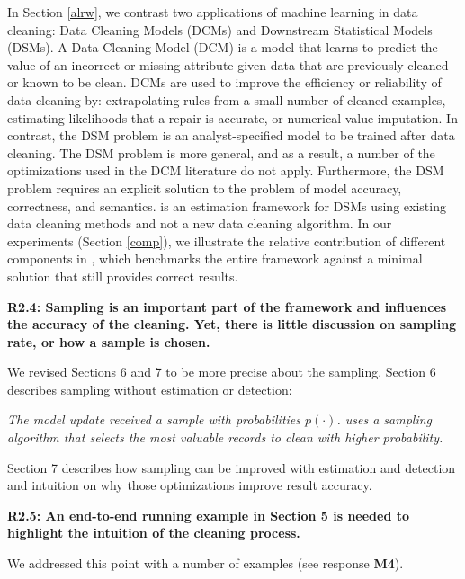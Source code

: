 In Section \ref{alrw}, we contrast two applications of machine learning in data cleaning: Data Cleaning Models (DCMs) and Downstream Statistical Models (DSMs).
A Data Cleaning Model (DCM) is a model that learns to predict the value of an incorrect or missing attribute given data that are previously cleaned or known to be clean.
DCMs are used to improve the efficiency or reliability of data cleaning by: extrapolating rules from a small number of cleaned examples, estimating likelihoods that a repair is accurate, or numerical value imputation.
In contrast, the DSM problem is an analyst-specified model to be trained after data cleaning.
The DSM problem is more general, and as a result, a number of the optimizations used in the DCM literature do not apply.
Furthermore, the DSM problem requires an explicit solution to the problem of model accuracy, correctness, and semantics. 
\sys is an estimation framework for DSMs using existing data cleaning methods and not a new data cleaning algorithm.
In our experiments (Section \ref{comp}), we illustrate the relative contribution of different components in \sys, which benchmarks the entire framework against a minimal solution that still provides correct results.


\vspace{0.5em}

\textbf{R2.4: Sampling is an important part of the framework and influences the accuracy of the cleaning. Yet, there is little discussion on sampling rate, or how a sample is chosen.}

We revised Sections 6 and 7 to be more precise about the sampling.
Section 6 describes sampling without estimation or detection:

\emph{The model update received a sample with probabilities $p(\cdot)$.
\sys uses a sampling algorithm that selects the most valuable records to clean with higher probability. }

\vspace{0.5em}

Section 7 describes how sampling can be improved with estimation and detection and intuition on why those optimizations improve result accuracy.

\vspace{0.5em}

\textbf{R2.5: An end-to-end running example in Section 5 is needed to highlight the intuition of the cleaning process.}

We addressed this point with a number of examples (see response \textbf{M4}).


